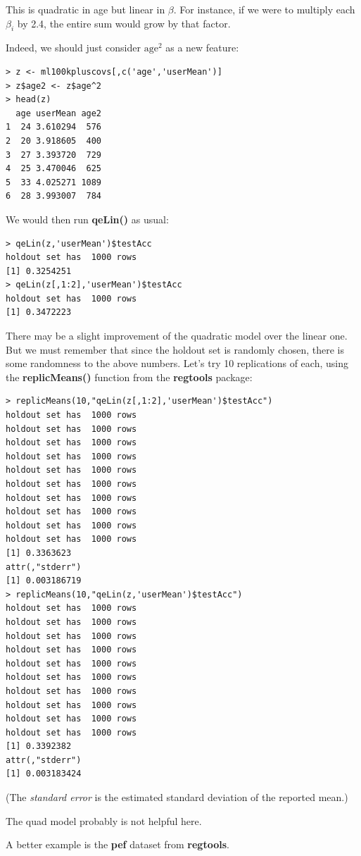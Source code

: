 This is quadratic in age but linear in $\beta$.  For instance, if we
were to multiply each $\beta_i$ by 2.4, the entire sum would grow by
that factor.

Indeed, we should just consider $\textrm{age}^2$ as a new feature:

\begin{lstlisting}
> z <- ml100kpluscovs[,c('age','userMean')] 
> z$age2 <- z$age^2
> head(z)
  age userMean age2
1  24 3.610294  576
2  20 3.918605  400
3  27 3.393720  729
4  25 3.470046  625
5  33 4.025271 1089
6  28 3.993007  784
\end{lstlisting}

We would then run \textbf{qeLin()} as usual:

\begin{lstlisting}
> qeLin(z,'userMean')$testAcc
holdout set has  1000 rows
[1] 0.3254251
> qeLin(z[,1:2],'userMean')$testAcc
holdout set has  1000 rows
[1] 0.3472223
\end{lstlisting}

There may be a slight improvement of the quadratic model over the linear
one.  But we must remember that since the holdout set is randomly
chosen, there is some randomness to the above numbers.  Let's try 10
replications of each, using the \textbf{replicMeans()} function from the
\textbf{regtools} package:

\begin{lstlisting}
> replicMeans(10,"qeLin(z[,1:2],'userMean')$testAcc")
holdout set has  1000 rows
holdout set has  1000 rows
holdout set has  1000 rows
holdout set has  1000 rows
holdout set has  1000 rows
holdout set has  1000 rows
holdout set has  1000 rows
holdout set has  1000 rows
holdout set has  1000 rows
holdout set has  1000 rows
[1] 0.3363623
attr(,"stderr")
[1] 0.003186719
> replicMeans(10,"qeLin(z,'userMean')$testAcc")
holdout set has  1000 rows
holdout set has  1000 rows
holdout set has  1000 rows
holdout set has  1000 rows
holdout set has  1000 rows
holdout set has  1000 rows
holdout set has  1000 rows
holdout set has  1000 rows
holdout set has  1000 rows
holdout set has  1000 rows
[1] 0.3392382
attr(,"stderr")
[1] 0.003183424
\end{lstlisting}

(The \textit{standard error} is the estimated standard deviation of the
reported mean.)

The quad model probably is not helpful here.

A better example is the \textbf{pef} dataset from \textbf{regtools}.

